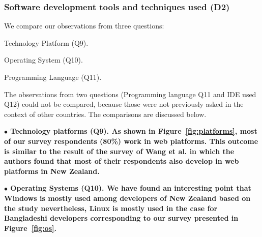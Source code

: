 \subsubsection{Software development tools and techniques used (D2)} \label{sec:rq2-d2}
% 
We compare our observations from three questions: \begin{inparaenum}
\item Technology Platform (Q9).
\item Operating System (Q10).
\item Programming Language (Q11).
\end{inparaenum} The observations from two questions (Programming language Q11 and IDE used Q12) could not be compared, because 
those were not previously asked in the context of other countries. The comparisons are discussed below.

% 

\nd\bf{$\bullet$ Technology platforms (Q9).} As shown in
Figure~\ref{fig:platforms}, most of our survey respondents (80\%) work in web
platforms. This outcome is similar to the result of the survey of Wang et al.
\citep{Wang2018} in which the authors found that most of their respondents also
develop in web platforms in New Zealand.


\nd\bf{$\bullet$ Operating Systems (Q10).} We have found an interesting point
that Windows is mostly used among developers of New Zealand based on the study
\citep{Wang2018} nevertheless, Linux is mostly used in the case for Bangladeshi
developers corresponding to our survey presented in Figure~\ref{fig:os}.

